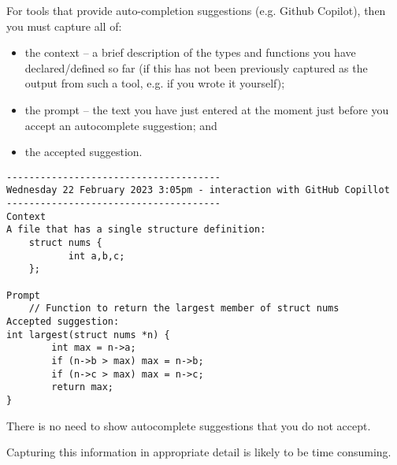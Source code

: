 \documentclass{article}
\begin{document}
For tools that provide auto-completion suggestions (e.g. Github Copilot), then you must capture all of:
\begin{itemize}
\item the context -- a brief description of the types and functions you have declared/defined so far (if this has not been
previously captured as the output from such a tool, e.g. if you wrote it yourself);
\item the prompt -- the text you have just entered at the moment just before you accept an autocomplete suggestion; and
\item the accepted suggestion.
\end{itemize}

\nolinenumbers
{}
\begin{lstlisting}
--------------------------------------
Wednesday 22 February 2023 3:05pm - interaction with GitHub Copillot
--------------------------------------
Context
A file that has a single structure definition:
	struct nums {
     	   int a,b,c;
	};

Prompt
	// Function to return the largest member of struct nums
Accepted suggestion:
int largest(struct nums *n) {
        int max = n->a;
        if (n->b > max) max = n->b;
        if (n->c > max) max = n->c;
        return max;
}
\end{lstlisting}
\linenumbers

There is no need to show autocomplete suggestions that you do not accept. 

Capturing this information in appropriate detail is likely to be time consuming.
\end{document}
